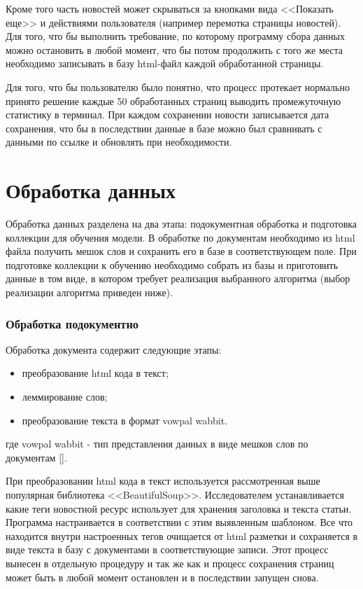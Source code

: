 Кроме того часть новостей может скрываться за кнопками вида <<Показать еще>> и действиями пользователя (например перемотка страницы новостей). Для того, что бы выполнить требование, по которому программу сбора данных можно остановить в любой момент, что бы потом продолжить с того же места необходимо записывать в базу html-файл каждой обработанной страницы.

Для того, что бы пользователю было понятно, что процесс протекает нормально принято решение каждые 50 обработанных страниц выводить промежуточную статистику в терминал. При каждом сохранении новости записывается дата сохранения, что бы в последствии данные в базе можно был сравнивать с данными по ссылке и обновлять при необходимости.

\section{Обработка данных}

Обработка данных разделена на два этапа: подокументная обработка и подготовка коллекции для обучения модели. В обработке по документам необходимо из html файла получить мешок слов и сохранить его в базе в соответствующем поле. При подготовке коллекции к обучению необходимо собрать из базы и приготовить данные в том виде, в котором требует реализация выбранного алгоритма (выбор реализации алгоритма приведен ниже).

\subsubsection{Обработка подокументно}

Обработка документа содержит следующие этапы:

\begin{itemize}
    \item преобразование html кода в текст;
    \item леммирование слов;
    \item преобразование текста в формат vowpal wabbit.
\end{itemize}
где vowpal wabbit - тип представления данных в виде мешков слов по документам [\todo{}].

При преобразовании html кода в текст используется рассмотренная выше популярная библиотека <<BeautifulSoup>>. Исследователем устанавливается какие теги новостной ресурс использует для хранения заголовка и текста статьи. Программа настраивается в соответствии с этим выявленным шаблоном. Все что находится внутри настроенных тегов очищается от html разметки и сохраняется в виде текста в базу с документами в соответствующие записи. Этот процесс вынесен в отдельную процедуру и так же как и процесс сохранения страниц может быть в любой момент остановлен и в последствии запущен снова.

